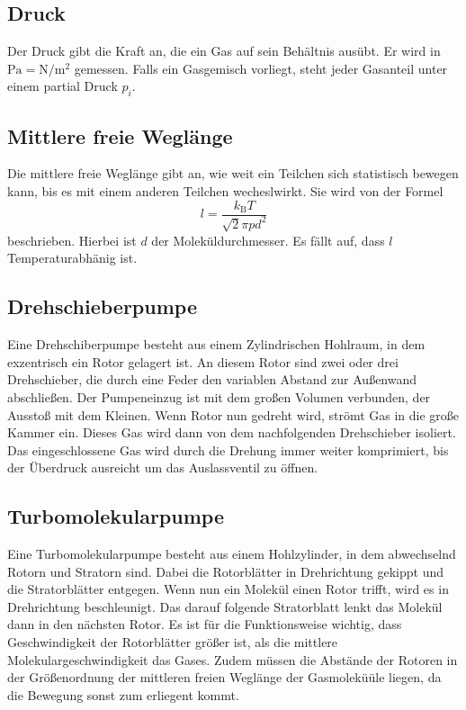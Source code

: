 \subsection{Druck}
Der Druck gibt die Kraft an, die ein Gas auf sein Behältnis ausübt. Er wird in $\si{\pascal}=\si{\newton \per \meter \squared}$ gemessen. Falls ein Gasgemisch
vorliegt, steht jeder Gasanteil unter einem partial Druck $p_i$.
\subsection{Mittlere freie Weglänge}
Die mittlere freie Weglänge gibt an, wie weit ein Teilchen sich statistisch bewegen kann, bis es mit einem anderen Teilchen wecheslwirkt.
Sie wird von der Formel
\begin{equation}
	l=\frac{k_\text{B}T}{\sqrt{2}\pi p d^2}
\end{equation}
beschrieben. Hierbei ist $d$ der Moleküldurchmesser. Es fällt auf, dass $l$ Temperaturabhänig ist.

\subsection{Drehschieberpumpe}
Eine Drehschiberpumpe besteht aus einem Zylindrischen Hohlraum, in dem exzentrisch ein Rotor gelagert ist. An diesem Rotor sind zwei oder drei Drehschieber,
die durch eine Feder den variablen Abstand zur Außenwand abschließen. Der Pumpeneinzug ist mit dem großen Volumen verbunden, der Ausstoß mit dem Kleinen.
Wenn Rotor nun gedreht wird, strömt Gas in die große Kammer ein. Dieses Gas wird dann von dem nachfolgenden Drehschieber isoliert. Das eingeschlossene Gas wird
durch die Drehung immer weiter komprimiert, bis der Überdruck ausreicht um das Auslassventil zu öffnen.
\subsection{Turbomolekularpumpe}
Eine Turbomolekularpumpe besteht aus einem Hohlzylinder, in dem abwechselnd Rotorn und Stratorn sind. Dabei die Rotorblätter in Drehrichtung gekippt und die
Stratorblätter entgegen. Wenn nun ein Molekül einen Rotor trifft, wird es in Drehrichtung beschleunigt. Das darauf folgende Stratorblatt lenkt das Molekül dann
in den nächsten Rotor. Es ist für die Funktionsweise wichtig, dass Geschwindigkeit der Rotorblätter größer ist, als die mittlere Molekulargeschwindigkeit das
Gases. Zudem müssen die Abstände der Rotoren in der Größenordnung der mittleren freien Weglänge der Gasmoleküüle liegen, da die Bewegung sonst zum erliegent
kommt.
